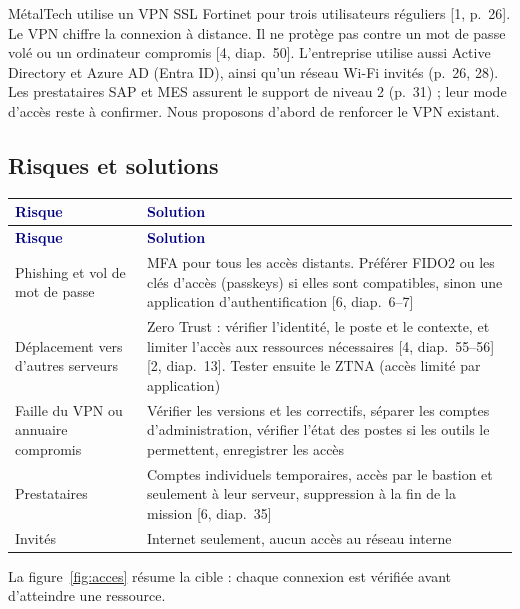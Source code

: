 \documentclass[11pt,a4paper]{article}
\newcommand{\thd}[1]{\textbf{\textcolor{navy}{#1}}}
\begin{document}
MétalTech utilise un VPN SSL Fortinet pour trois utilisateurs réguliers [1, p.~26]. Le VPN chiffre la connexion à distance. Il ne protège pas contre un mot de passe volé ou un ordinateur compromis [4, diap.~50]. L'entreprise utilise aussi Active Directory et Azure AD (Entra ID), ainsi qu'un réseau Wi-Fi invités (p.~26, 28). Les prestataires SAP et MES assurent le support de niveau 2 (p.~31) ; leur mode d'accès reste à confirmer. Nous proposons d'abord de renforcer le VPN existant.

\subsection*{Risques et solutions}
\begin{xltabular}{\linewidth}{@{}P{42mm}Y@{}}\toprule
\thd{Risque} & \thd{Solution}\\\midrule\endfirsthead
\toprule \thd{Risque} & \thd{Solution}\\\midrule\endhead
\bottomrule\endfoot
Phishing et vol de mot de passe & MFA pour tous les accès distants. Préférer FIDO2 ou les clés d'accès (passkeys) si elles sont compatibles, sinon une application d'authentification [6, diap.~6--7]\\
Déplacement vers d'autres serveurs & Zero Trust : vérifier l'identité, le poste et le contexte, et limiter l'accès aux ressources nécessaires [4, diap.~55--56] [2, diap.~13]. Tester ensuite le ZTNA (accès limité par application)\\
Faille du VPN ou annuaire compromis & Vérifier les versions et les correctifs, séparer les comptes d'administration, vérifier l'état des postes si les outils le permettent, enregistrer les accès\\
Prestataires & Comptes individuels temporaires, accès par le bastion et seulement à leur serveur, suppression à la fin de la mission [6, diap.~35]\\*
Invités & Internet seulement, aucun accès au réseau interne\\
\end{xltabular}

La figure~\ref{fig:acces} résume la cible : chaque connexion est vérifiée avant d'atteindre une ressource.
\end{document}
